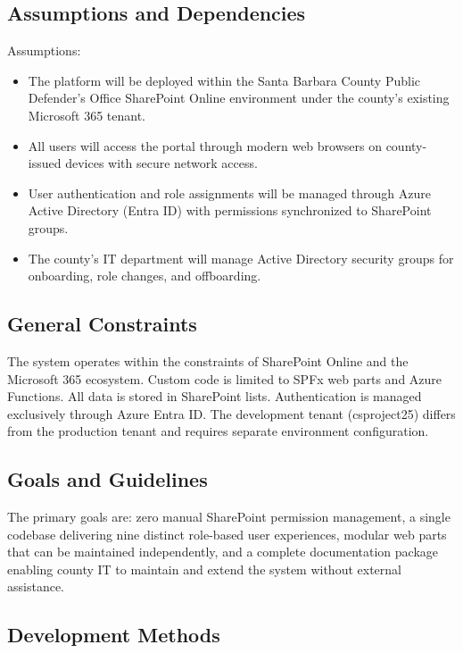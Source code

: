 \documentclass[12pt]{article}
\begin{document}
\subsection{Assumptions and Dependencies}

Assumptions:

\begin{itemize}[leftmargin=*]
\item  The platform will be deployed within the Santa Barbara County Public Defender's Office SharePoint Online environment under the county's existing Microsoft 365 tenant.
\item  All users will access the portal through modern web browsers on county-issued devices with secure network access.
\item  User authentication and role assignments will be managed through Azure Active Directory (Entra ID) with permissions synchronized to SharePoint groups.
\item  The county's IT department will manage Active Directory security groups for onboarding, role changes, and offboarding.
\end{itemize}

\subsection{General Constraints}

The system operates within the constraints of SharePoint Online and the Microsoft 365 ecosystem. Custom code is limited to SPFx web parts and Azure Functions. All data is stored in SharePoint lists. Authentication is managed exclusively through Azure Entra ID. The development tenant (csproject25) differs from the production tenant and requires separate environment configuration.

\subsection{Goals and Guidelines}

The primary goals are: zero manual SharePoint permission management, a single codebase delivering nine distinct role-based user experiences, modular web parts that can be maintained independently, and a complete documentation package enabling county IT to maintain and extend the system without external assistance.

\subsection{Development Methods}
\end{document}
